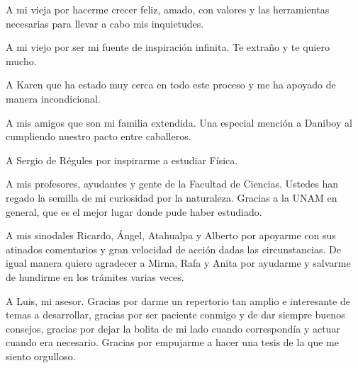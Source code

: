 A mi vieja por hacerme crecer feliz, amado, con valores y las herramientas necesarias para llevar a cabo mis inquietudes. 

A mi viejo por ser mi fuente de inspiración infinita. Te extraño y te quiero mucho.

A Karen que ha estado muy cerca en todo este proceso y me ha apoyado de manera incondicional. 

A mis amigos que son mi familia extendida. Una especial mención a Daniboy al cumpliendo nuestro pacto entre caballeros. 

A Sergio de Régules por inspirarme a estudiar Física.

A mis profesores, ayudantes y gente de la Facultad de Ciencias. Ustedes han regado la semilla de mi curiosidad por la naturaleza. Gracias a la UNAM en general, que es el mejor lugar donde pude haber estudiado.

A mis sinodales Ricardo, Ángel, Atahualpa y Alberto por apoyarme con sus atinados comentarios y gran velocidad de acción dadas las circunstancias. De igual manera quiero agradecer a Mirna, Rafa y Anita por ayudarme y salvarme de hundirme en los trámites varias veces. 

A Luis, mi asesor. Gracias por darme un repertorio tan amplio e interesante de temas a desarrollar, gracias por ser paciente conmigo y de dar siempre buenos consejos, gracias por dejar la bolita de mi lado cuando correspondía y actuar cuando era necesario. Gracias por empujarme a hacer una tesis de la que me siento orgulloso. 



